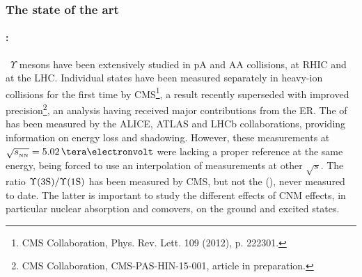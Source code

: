 \documentclass[a4paper,11pt]{article}
\newcommand{\ER}{ER\xspace}
\begin{document}






\subsubsection{The state of the art} \label{sec:stateoftheart}

\paragraph{\PgUabc:\ }\ 
$\Upsilon$ mesons have been extensively studied in pA and AA collisions, at RHIC and at the LHC. Individual
\PgUabc states have been measured separately in heavy-ion collisions for the first time by CMS\footnote{CMS Collaboration, Phys. Rev. Lett. 109 (2012), p. 222301. },
a result recently superseded with improved precision\footnote{CMS Collaboration, CMS-PAS-HIN-15-001, article in preparation.}, an analysis having received major contributions from the \ER. The \rpa of \PgUa has been measured by the ALICE, ATLAS and LHCb collaborations, providing information on energy loss and shadowing. However,
these measurements at $\sqrtsnn = 5.02\,\TeV$ were lacking a proper \pp reference at the same energy, being forced to use an interpolation of measurements at other
$\sqrt{s}$. The ratio $\Upsilon\text{(3S)}/\Upsilon\text{(1S)}$ has been measured by CMS, but not the \rpa (\PgUc), never measured to date. The latter is important to study the different effects of CNM effects, in particular nuclear absorption and comovers, on the ground and excited states.
\end{document}
